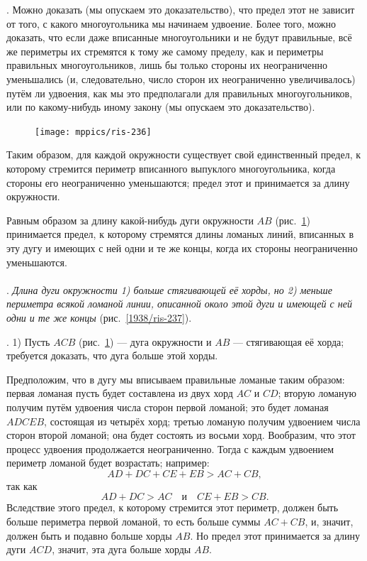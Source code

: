 \documentclass[twoside]{book}
\begin{document}
\smallskip
{}.
Можно доказать (мы опускаем это доказательство), что предел этот не зависит от того, с какого многоугольника мы начинаем удвоение.
Более того, можно доказать, что если даже вписанные многоугольники и не будут правильные, всё же периметры их стремятся к тому же самому пределу, как и периметры правильных многоугольников, лишь бы только стороны их неограниченно уменьшались (и, следовательно, число сторон их неограниченно увеличивалось) путём ли удвоения, как мы это предполагали для правильных многоугольников, или по какому-нибудь иному закону (мы опускаем это доказательство).

\begin{figure}
\centering
\texttt{[image: mppics/ris-236]}
\caption{}\label{1938/ris-236}
\end{figure}

{\sloppy

Таким образом, для каждой окружности существует свой единственный предел, к которому стремится периметр вписанного выпуклого многоугольника, когда стороны его неограниченно уменьшаются;
предел этот и принимается за длину окружности.

}

Равным образом за длину какой-нибудь дуги окружности $AB$ (рис.~\ref{1938/ris-236}) принимается предел, к которому стремятся длины ломаных линий, вписанных в эту дугу и имеющих с ней одни и те же концы, 
когда их стороны неограниченно уменьшаются.

\paragraph{}\label{1938/235}
.
\emph{Длина дуги окружности
1) больше стягивающей её хорды, но 2) меньше периметра всякой ломаной линии, описанной около этой дуги и имеющей с ней одни и те же концы} (рис.~\ref{1938/ris-237}).

{\sloppy

.
1) Пусть $ACB$ (рис.~\ref{1938/ris-236}) — дуга окружности и $AB$ — стягивающая её хорда;
требуется доказать, что дуга больше этой хорды.

}

Предположим, что в дугу мы вписываем правильные ломаные таким образом:
первая ломаная пусть будет составлена из двух хорд $AC$ и $CD$;
вторую ломаную получим путём удвоения числа сторон первой ломаной;
это будет ломаная $ADCEB$, состоящая из четырёх хорд;
третью ломаную получим удвоением числа сторон второй ломаной;
она будет состоять из восьми хорд.
Вообразим, что этот процесс удвоения продолжается неограниченно.
Тогда с каждым удвоением периметр ломаной будет возрастать;
например:
\[AD+DC+CE+EB>AC+CB,\]
так как
\[AD+DC>AC\quad\text{и}\quad CE+EB>CB.\]
Вследствие этого предел, к которому стремится этот периметр, должен быть больше периметра первой ломаной, то есть больше суммы $AC+CB$, и, значит, должен быть и подавно больше хорды $AB$.
Но предел этот принимается за длину дуги $ACD$, значит, эта дуга больше хорды $AB$.
\end{document}
